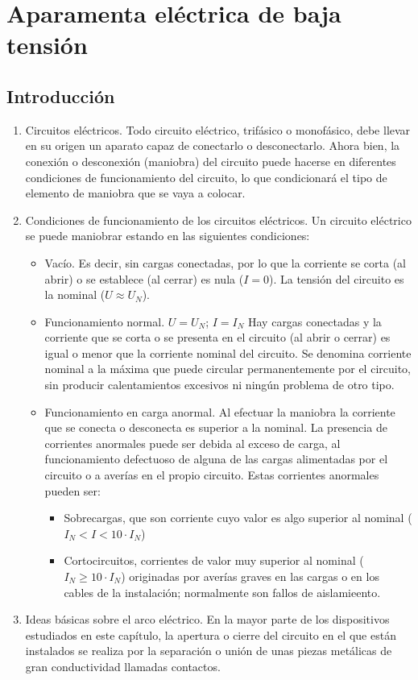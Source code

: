 \chapter{Aparamenta eléctrica de baja tensión}
\section{Introducción}
\begin{enumerate}
    \item Circuitos eléctricos. Todo circuito eléctrico, trifásico o monofásico, debe llevar en su origen un aparato capaz de conectarlo o desconectarlo. Ahora bien, la conexión o desconexión (maniobra) del circuito puede hacerse en diferentes condiciones de funcionamiento del circuito, lo que condicionará el tipo de elemento de maniobra que se vaya a colocar.
    \item Condiciones de funcionamiento de los circuitos eléctricos. Un circuito eléctrico se puede maniobrar estando en las siguientes condiciones:
    \begin{itemize}
        \item Vacío. Es decir, sin cargas conectadas, por lo que la corriente se corta (al abrir) o se establece (al cerrar) es nula ($I = 0$). La tensión del circuito es la nominal ($U \approx U_N$).
        \item Funcionamiento normal. $U = U_N$; $I = I_N$ Hay cargas conectadas y la corriente que se corta o se presenta en el circuito (al abrir o cerrar) es igual o menor que la corriente nominal del circuito. Se denomina corriente nominal a la máxima que puede circular permanentemente por el circuito, sin producir calentamientos excesivos ni ningún problema de otro tipo.
        \item Funcionamiento en carga anormal. Al efectuar la maniobra la corriente que se conecta o desconecta es superior a la nominal. La presencia de corrientes anormales puede ser debida al exceso de carga, al funcionamiento defectuoso de alguna de las cargas alimentadas por el circuito o a averías en el propio circuito. Estas corrientes anormales pueden ser:
        \begin{itemize}
            \item Sobrecargas, que son corriente cuyo valor es algo superior al nominal ($I_N < I < 10 \cdot I_N$)
            \item Cortocircuitos, corrientes de valor muy superior al nominal ($I_N \geq 10 \cdot I_N$) originadas por averías graves en las cargas o en los cables de la instalación; normalmente son fallos de aislamieento.
        \end{itemize}
    \end{itemize}
    \item Ideas básicas sobre el arco eléctrico. 
    En la mayor parte de los dispositivos estudiados en este capítulo, la apertura o cierre del circuito en el que están instalados se realiza por la separación o unión de unas piezas metálicas de gran conductividad llamadas contactos.


\end{enumerate}
